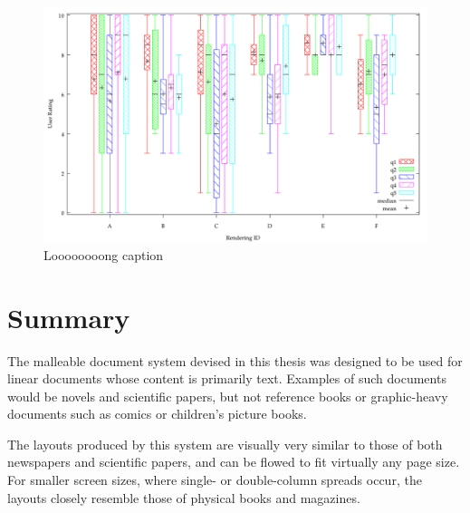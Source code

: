 \begin{figure}
  \begin{center}
  \includegraphics[height=0.5\textheight]{gnuplot/survey.pdf}
  \end{center}
  \caption[Short Caption]{Loooooooong caption}
  \label{fig:survey}
\end{figure}





\section{Summary}
The malleable document system devised in this thesis was designed to be used for linear documents whose content is primarily text. Examples of such documents would be novels and scientific papers, but not reference books or graphic-heavy documents such as comics or children's picture books.

The layouts produced by this system are visually very similar to those of both newspapers and scientific papers, and can be flowed to fit virtually any page size. For smaller screen sizes, where single- or double-column spreads occur, the layouts closely resemble those of physical books and magazines.

